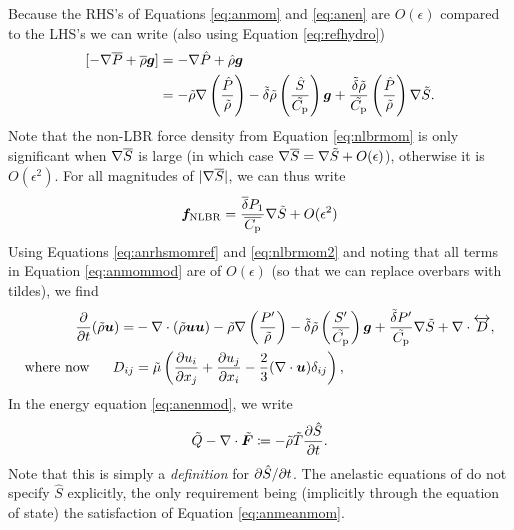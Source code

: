 \documentclass[12pt]{article}
\newcommand{\vecf}{\bm{F}}
\newcommand{\deltaref}{\overline{\delta}}
\newcommand{\cpref}{\overline{\cpcap}}
\begin{document}
Because the RHS's of Equations \eqref{eq:anmom} and \eqref{eq:anen} are $O(\epsilon)$ compared to the LHS's we can write (also using Equation \eqref{eq:refhydro})
\begin{align}\label{eq:anrhsmomref}
	[-\nabla \overline{P} + \overline{\rho}\bm{g}] &= -\nabla \hat{P} + \hat{\rho}\bm{g}\nonumber\\
	&= -\tilde{\rho}\nabla\left(\frac{\hat{P}}{\tilde{\rho}}\right) - \tilde{\delta} \tilde{\rho} \left(\frac{\hat{S}}{\tilde{C_{\rm{p}}}}\right) \bm{g} + \frac{\tilde{\delta}\tilde{\rho}}{\tilde{C_{\rm{p}}}} \left(\frac{\hat{P}}{\tilde{\rho}}\right)\nabla\tilde{S}.
\end{align}
Note that the non-LBR force density from Equation \eqref{eq:nlbrmom} is only significant when $\nabla\overline{S}$ is large (in which case $\nabla\overline{S}=\nabla\tilde{S}+O(\epsilon)$), otherwise it is $O(\epsilon^2)$. For all magnitudes of $|\nabla\overline{S}|$, we can thus write
\begin{align}\label{eq:nlbrmom2}
	\bm{f}_{\rm NLBR} = \frac{\deltaref P_1}{\cpref} \nabla\tilde{S} + O(\epsilon^2)
\end{align}
Using Equations \eqref{eq:anrhsmomref} and \eqref{eq:nlbrmom2} and noting that all terms in Equation \eqref{eq:anmommod} are of $O(\epsilon)$ (so that we can replace overbars with tildes), we find
	\begin{align}\label{eq:anmomref}
	\frac{\partial}{\partial t}(\tilde{\rho}\bm{u})= &-\nabla\cdot(\tilde{\rho}\bm{u}\bm{u}) -\tilde{\rho}\nabla\left(\frac{P^\prime}{\tilde{\rho}}\right) - \tilde{\delta}\tilde{\rho} \left(\frac{S^\prime}{\tilde{C_{\rm{p}}}}\right) \bm{g} +\frac{\tilde{\delta} P^\prime}{\tilde{C_{\rm{p}}}} \nabla\tilde{S}+\nabla\cdot \overleftrightarrow{D},\\
	\text{where now}\ \ \ \ \  D_{ij}& = \tilde{\mu}\left(\frac{\partial u_i}{\partial x_j} + \frac{\partial u_j}{\partial x_i} - \frac{2}{3}(\nabla\cdot\bm{u})\delta_{ij}\right)\label{eq:anmomrefvisc},
\end{align}
In the energy equation \eqref{eq:anenmod}, we write 
\begin{align}\label{eq:dsdt}
	\tilde{Q} - \Div\tilde{\vecf} \define -\tilde{\rho}\tilde{T}\pderiv{\hat{S}}{t}.
\end{align}
Note that this is simply a \textit{definition} for $\partial\hat{S}/\partial t$. The anelastic equations of \citet{Gough1969} do not specify $\hat{S}$ explicitly, the only requirement being (implicitly through the equation of state) the satisfaction of Equation \eqref{eq:anmeanmom}. 
\end{document}

